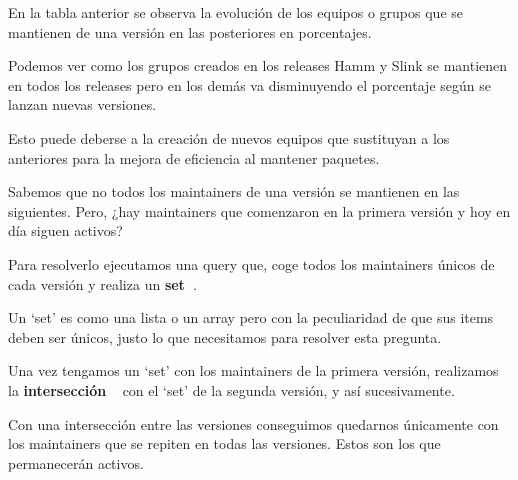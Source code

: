 \documentclass[a4paper, 12pt]{book}
\begin{document}
En la tabla anterior se observa la evolución de los equipos o grupos que se mantienen de una versión en las posteriores en porcentajes.

Podemos ver como los grupos creados en los releases Hamm y Slink se mantienen en todos los releases pero en los demás va disminuyendo el porcentaje según se lanzan nuevas versiones.

Esto puede deberse a la creación de nuevos equipos que sustituyan a los anteriores para la mejora de eficiencia al mantener paquetes.

Sabemos que no todos los maintainers de una versión se mantienen en las siguientes. Pero, ¿hay maintainers que comenzaron en la primera versión y hoy en día siguen activos?

Para resolverlo ejecutamos una query que, coge todos los maintainers únicos de cada versión y realiza un \textbf{set~\cite{ellibrodepython:_set}}.

Un `set' es como una lista o un array pero con la peculiaridad de que sus items deben ser únicos, justo lo que necesitamos para resolver esta pregunta.

Una vez tengamos un `set' con los maintainers de la primera versión, realizamos la \textbf{intersección} ~\cite{medium:_intersection} con el `set' de la segunda versión, y así sucesivamente. 

Con una intersección entre las versiones conseguimos quedarnos únicamente con los maintainers que se repiten en todas las versiones. Estos son los que permanecerán activos.
\end{document}
